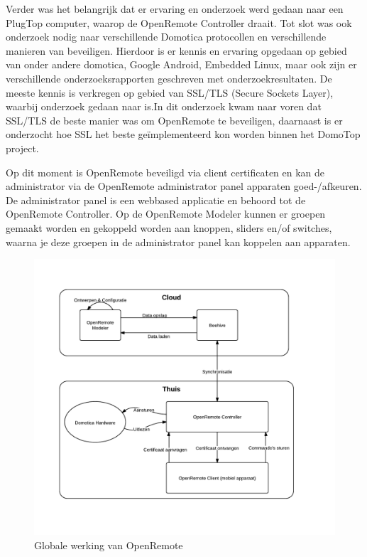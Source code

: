 \documentclass[]{article}
\begin{document}
Verder was het belangrijk dat er ervaring en onderzoek werd gedaan naar een PlugTop computer, waarop de OpenRemote Controller
draait. Tot slot was ook onderzoek nodig naar verschillende Domotica
protocollen en verschillende manieren van beveiligen. Hierdoor is er kennis en
ervaring opgedaan op gebied van onder andere domotica, Google Android, Embedded
Linux, maar ook zijn er verschillende onderzoeksrapporten geschreven met
onderzoekresultaten. De meeste kennis is verkregen op gebied van SSL/TLS (Secure Sockets Layer),
waarbij onderzoek gedaan naar is.In dit onderzoek kwam naar voren dat SSL/TLS
de beste manier was om OpenRemote te beveiligen, daarnaast is er onderzocht hoe
SSL het beste ge\"implementeerd kon worden binnen het DomoTop project. 

Op dit moment is OpenRemote beveiligd via client certificaten en kan de
administrator via de OpenRemote administrator panel apparaten goed-/afkeuren. De
administrator panel is een webbased applicatie en behoord tot de OpenRemote
Controller. Op de OpenRemote Modeler kunnen er groepen gemaakt worden en
gekoppeld worden aan knoppen, sliders en/of switches, waarna je deze groepen in
de administrator panel kan koppelen aan apparaten.

\begin{figure}[htpb]
   \begin{center}
     \includegraphics[width=\textwidth]{GlobalOR.pdf}
   \end{center}
   \caption{Globale werking van OpenRemote}
   \label{global}
\end{figure}
\end{document}
